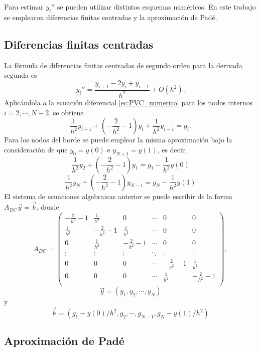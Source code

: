 \documentclass[aps,prb,twocolumn,superscriptaddress,floatfix,longbibliography]{revtex4-2}
\newif\ifptitle
\newif\ifpnumber
\newcounter{para}
\newcommand\ptitle[1]{\par\refstepcounter{para}
{\ifpnumber{\noindent\textcolor{lightgray}{\textbf{\thepara}}\indent}\fi}
{\ifptitle{\textbf{[{#1}]}}\fi}}
\begin{document}
\ptitle{Para estimar y'' emplearon diferencias finitas centradas de segundo orden y el \textcolor{red}{esquema} de Padé \textcolor{red}{de 4to orden}}
Para estimar $y_i''$ se pueden utilizar distintos esquemas numéricos. En este trabajo se emplearon diferencias finitas centradas y la aproximación de Padé.


\subsection{Diferencias finitas centradas}
La fórmula de diferencias finitas centradas de segundo orden para la derivada segunda es \cite{Moin}
\begin{equation}
    y_i'' = \frac{y_{i+1} - 2 y_i + y_{i-1}}{h^2} + O(h^2).
    \label{ec:diferencias_centradas}
\end{equation}
Aplicándola a la ecuación diferencial \ref{ec:PVC_numerico} para los nodos internos $i = 2, \cdots, N-2$, se obtiene
\[ \frac{1}{h^2} y_{i-1} + \left (-\frac{2}{h^2} - 1 \right ) y_i + \frac{1}{h^2} y_{i-1} = g_i.\]
Para los nodos del borde se puede emplear la misma aproximación bajo la consideración de que $y_0 = y(0)$ e $y_{N+1} = y(1)$, es decir,
\[\frac{1}{h^2}y_2 + \left (-\frac{2}{h^2} - 1 \right ) y_1 = g_1 - \frac{1}{h^2}y(0)  \]
\[\frac{1}{h^2}y_N + \left (-\frac{2}{h^2} - 1 \right ) y_{N-1} = g_N - \frac{1}{h^2}y(1)  \]
El sistema de ecuaciones algebraicas anterior se puede escribir de la forma $A_{DC} \vec{y} = \vec{b}$, donde
\[
    A_{DC} = \left(\begin{matrix}
        -\frac{2}{h^2} - 1 & \frac{1}{h^2} & 0 & \cdots & 0 & 0\\
        \frac{1}{h^2} & -\frac{2}{h^2} - 1 & \frac{1}{h^2} & \cdots & 0 & 0\\
        0 & \frac{1}{h^2} & -\frac{2}{h^2} - 1 & \cdots & 0 & 0\\
        \vdots & \vdots & \vdots & \ddots & \vdots & \vdots\\
        0 & 0 & 0 & \cdots & -\frac{2}{h^2} - 1 & \frac{1}{h^2}\\
        0 & 0 & 0 & \cdots & \frac{1}{h^2} & -\frac{2}{h^2} - 1\\
        \end{matrix}\right),
\]
\[\vec{y} = (y_1, y_2, \cdots, y_N)\]
y
\[\vec{b} = (g_1 - y(0)/h^2, g_2, \cdots, g_{N-1}, g_N -  y(1)/h^2)\]


\subsection{Aproximación de Padé}
\end{document}
